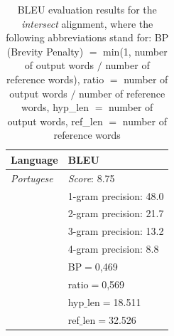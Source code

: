 \documentclass[11pt]{article}
\begin{document}
\begin{itemize}
\begin{center}
    \begin{table}
    \begin{tabular}{ | l | l |}
    \hline
    \textbf{Language} & \textbf{BLEU} \\ 
    \hline    
    \textit{Portugese} & \textit{Score}: 8.75 \\
    & 1-gram precision: 48.0 \\
    & 2-gram precision: 21.7 \\
    & 3-gram precision: 13.2 \\
    & 4-gram precision: 8.8 \\
    & BP$=$0,469 \\
    & ratio$=$0,569 \\
    & hyp$\_$len$=$18.511 \\
    & ref$\_$len$=$32.526\\
    \hline
    \end{tabular}
    \caption{BLEU evaluation results for the \textit{intersect} alignment, where the following abbreviations stand for: BP (Brevity Penalty) $=$ min(1, number of output words $/$ number of reference words), ratio $=$ number of output words $/$ number of reference words, hyp\_len $=$ number of output words, ref\_len $=$ number of reference words }
    \label{bleuIntersect}
    \end{table}
\end{center}

\end{itemize}
\end{document}
